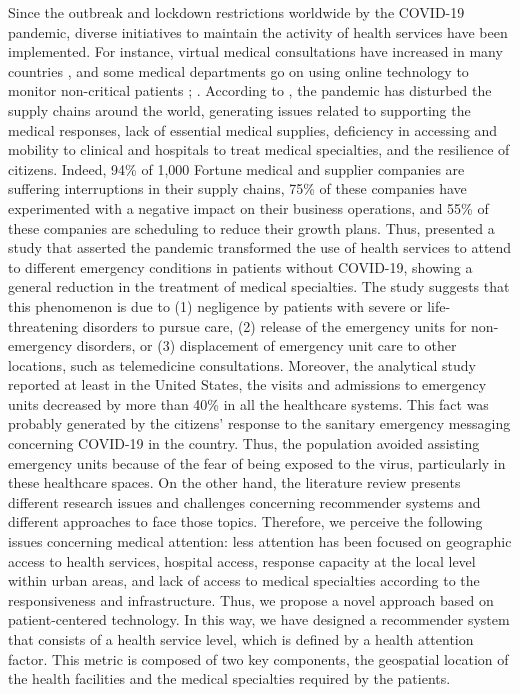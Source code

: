 \documentclass[sustainability,article,submit,pdftex,moreauthors]{Definitions/mdpi}
\begin{document}
Since the outbreak and lockdown restrictions worldwide by the COVID-19 pandemic, diverse initiatives to maintain the activity of health services have been implemented. For instance, virtual medical consultations have increased in many countries \citep{banerjee2020teleconsultation}, and some medical departments go on using online technology to monitor non-critical patients \citep{pinar2021preliminary}; \citep{tamayo2020evaluation}. According to \citet{shahed2021supply}, the pandemic has disturbed the supply chains around the world, generating issues related to supporting the medical responses, lack of essential medical supplies, deficiency in accessing and mobility to clinical and hospitals to treat medical specialties, and the resilience of citizens. Indeed, 94\% of 1,000 Fortune medical and supplier companies are suffering interruptions in their supply chains, 75\% of these companies have experimented with a negative impact on their business operations, and 55\% of these companies are scheduling to reduce their growth plans.
Thus, \citet{rosenbaum2020untold} presented a study that asserted the pandemic transformed the use of health services to attend to different emergency conditions in patients without COVID-19, showing a general reduction in the treatment of medical specialties. The study suggests that this phenomenon is due to (1) negligence by patients with severe or life-threatening disorders to pursue care, (2) release of the emergency units for non-emergency disorders, or (3) displacement of emergency unit care to other locations, such as telemedicine consultations. Moreover, the analytical study reported at least in the United States, the visits and admissions to emergency units decreased by more than 40\% in all the healthcare systems. This fact was probably generated by the citizens' response to the sanitary emergency messaging concerning COVID-19 in the country. Thus, the population avoided assisting emergency units because of the fear of being exposed to the virus, particularly in these healthcare spaces.
On the other hand, the literature review presents different research issues and challenges concerning recommender systems and different approaches to face those topics.  
Therefore, we perceive the following issues concerning medical attention: less attention has been focused on geographic access to health services, hospital access, response capacity at the local level within urban areas, and lack of access to medical specialties according to the responsiveness and infrastructure. Thus, we propose a novel approach based on patient-centered technology. In this way, we have designed a recommender system that consists of a health service level, which is defined by a health attention factor. This metric is composed of two key components, the geospatial location of the health facilities and the medical specialties required by the patients. 
\end{document}
